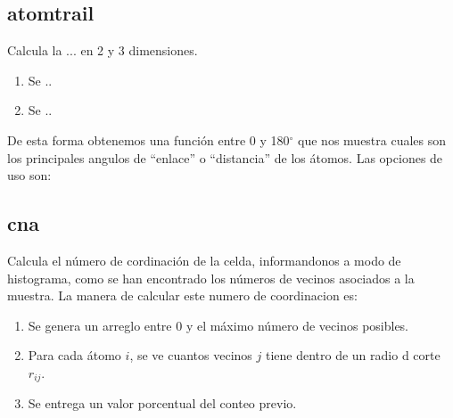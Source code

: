 
\subsection{atomtrail}
Calcula la ... en 2 y 3 dimensiones.
\begin{enumerate}
 \item Se ..
 \item Se ..
\end{enumerate}

De esta forma obtenemos una funci\'on entre 0 y 180$^\circ$ que nos muestra
cuales son los principales angulos de ``enlace'' o ``distancia'' de los
\'atomos. Las opciones de uso son:


\subsection{cna}
Calcula el n\'umero de cordinaci\'on de la celda, informandonos a modo de
histograma, como se han encontrado los n\'umeros de vecinos asociados a la
muestra. La manera de calcular este numero de coordinacion es:

\begin{enumerate}
 \item Se genera un arreglo entre 0 y el m\'aximo n\'umero de vecinos posibles.
 \item Para cada \'atomo $i$, se ve cuantos vecinos $j$ tiene dentro de un radio
d corte $r_{ij}$.
 \item Se entrega un valor porcentual del conteo previo.
\end{enumerate}

